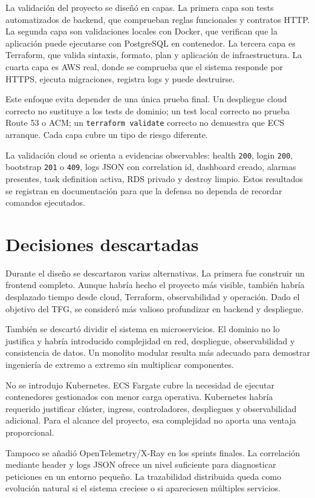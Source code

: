 La validación del proyecto se diseñó en capas. La primera capa son tests automatizados de backend, que comprueban reglas funcionales y contratos HTTP. La segunda capa son validaciones locales con Docker, que verifican que la aplicación puede ejecutarse con PostgreSQL en contenedor. La tercera capa es Terraform, que valida sintaxis, formato, plan y aplicación de infraestructura. La cuarta capa es AWS real, donde se comprueba que el sistema responde por HTTPS, ejecuta migraciones, registra logs y puede destruirse.

Este enfoque evita depender de una única prueba final. Un despliegue cloud correcto no sustituye a los tests de dominio; un test local correcto no prueba Route 53 o ACM; un \texttt{terraform validate} correcto no demuestra que ECS arranque. Cada capa cubre un tipo de riesgo diferente.

La validación cloud se orienta a evidencias observables: health \texttt{200}, login \texttt{200}, bootstrap \texttt{201} o \texttt{409}, logs JSON con correlation id, dashboard creado, alarmas presentes, task definition activa, RDS privado y destroy limpio. Estos resultados se registran en documentación para que la defensa no dependa de recordar comandos ejecutados.

\section{Decisiones descartadas}
\label{sec:decisiones-descartadas}

Durante el diseño se descartaron varias alternativas. La primera fue construir un frontend completo. Aunque habría hecho el proyecto más visible, también habría desplazado tiempo desde cloud, Terraform, observabilidad y operación. Dado el objetivo del TFG, se consideró más valioso profundizar en backend y despliegue.

También se descartó dividir el sistema en microservicios. El dominio no lo justifica y habría introducido complejidad en red, despliegue, observabilidad y consistencia de datos. Un monolito modular resulta más adecuado para demostrar ingeniería de extremo a extremo sin multiplicar componentes.

No se introdujo Kubernetes. ECS Fargate cubre la necesidad de ejecutar contenedores gestionados con menor carga operativa. Kubernetes habría requerido justificar clúster, ingress, controladores, despliegues y observabilidad adicional. Para el alcance del proyecto, esa complejidad no aporta una ventaja proporcional.

Tampoco se añadió OpenTelemetry/X-Ray en los sprints finales. La correlación mediante header y logs JSON ofrece un nivel suficiente para diagnosticar peticiones en un entorno pequeño. La trazabilidad distribuida queda como evolución natural si el sistema creciese o si apareciesen múltiples servicios.
